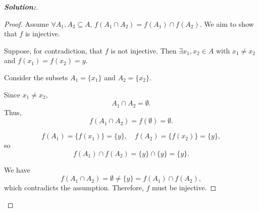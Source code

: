 \documentclass[12pt]{article}
\theoremstyle{definition}\newtheorem{problem}{Problem}
\newenvironment{solution}{\begin{proof}[\bfseries\textup{Solution:}]}{\end{proof}}
\begin{document}
\begin{solution}
    \begin{proof}
    Assume \( \forall A_1, A_2 \subseteq A,\, f(A_1 \cap A_2) = f(A_1) \cap f(A_2) \). We aim to show that \( f \) is injective.
    
    Suppose, for contradiction, that \( f \) is not injective. Then \( \exists x_1, x_2 \in A \) with \( x_1 \neq x_2 \) and \( f(x_1) = f(x_2) = y \).
    
    Consider the subsets \( A_1 = \{x_1\} \) and \( A_2 = \{x_2\} \).
    
    
    
    Since \( x_1 \neq x_2 \),
    \[
    A_1 \cap A_2 = \emptyset.
    \]
    Thus,
    \[
    f(A_1 \cap A_2) = f(\emptyset) = \emptyset.
    \]
    
    
    \[
    f(A_1) = \{f(x_1)\} = \{y\}, \quad f(A_2) = \{f(x_2)\} = \{y\},
    \]
    so
    \[
    f(A_1) \cap f(A_2) = \{y\} \cap \{y\} = \{y\}.
    \]
    
    We have
    \[
    f(A_1 \cap A_2) = \emptyset \neq \{y\} = f(A_1) \cap f(A_2),
    \]
    which contradicts the assumption.
    Therefore, \( f \) must be injective.
    \end{proof}
    
    


\end{solution}
\end{document}
